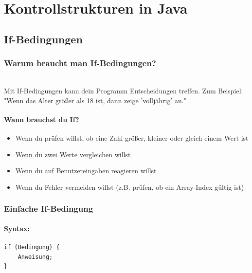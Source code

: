 \begingroup
\let\cleardoublepage\relax


\chapter*{Kontrollstrukturen in Java}
\label{ch:kontrollstrukturen-in-java}
\endgroup


\section*{If-Bedingungen}

\subsection*{Warum braucht man If-Bedingungen?}\\
Mit If-Bedingungen kann dein Programm Entscheidungen treffen.
Zum Beispiel: "Wenn das Alter größer als 18 ist, dann zeige 'volljährig' an."

\subsubsection*{Wann brauchst du If?}
\begin{itemize}
	\item Wenn du prüfen willst, ob eine Zahl größer, kleiner oder gleich einem Wert ist
	\item Wenn du zwei Werte vergleichen willst
	\item Wenn du auf Benutzereingaben reagieren willst
	\item Wenn du Fehler vermeiden willst (z.B. prüfen, ob ein Array-Index gültig ist)
\end{itemize}

\newpage


\subsection*{Einfache If-Bedingung}

\subsubsection*{Syntax:}
\begin{lstlisting}
if (Bedingung) {
    Anweisung;
}
\end{lstlisting}

